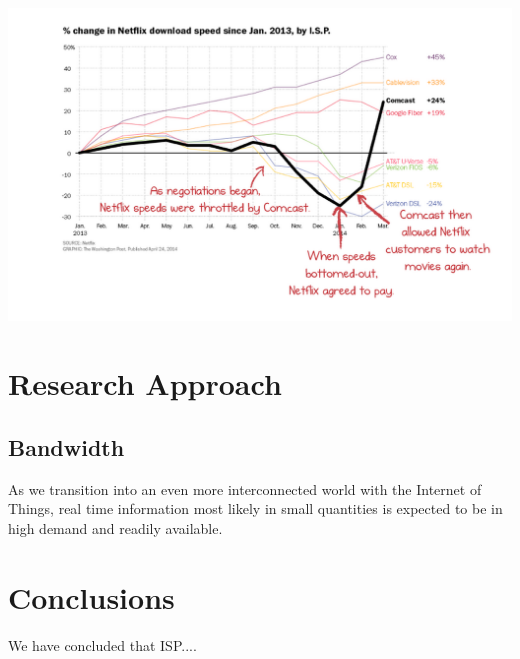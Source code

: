 \documentclass{sigcomm-alternate}
\begin{document}
\includegraphics[scale=.15]{NetflixGraph.png}


\section{Research Approach}

\subsection{Bandwidth}
As we transition into an even more interconnected world with the Internet of Things, real time information most likely in small quantities is expected to be in high demand and readily available.


\section{Conclusions}
We have concluded that ISP....





\end{document}
